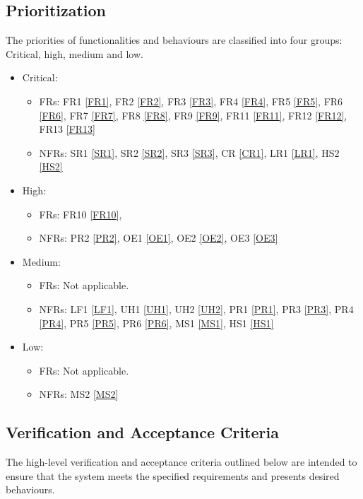 \documentclass[12pt]{article}
\begin{document}
\subsection{Prioritization}
The priorities of functionalities and behaviours are classified into four groups: Critical, high, medium and low. 
\begin{itemize}
    \item Critical:
    \begin{itemize}
        \item[] FRs: FR1 \ref{FR1}, FR2 \ref{FR2}, FR3 \ref{FR3}, FR4 \ref{FR4}, FR5 \ref{FR5}, FR6 \ref{FR6}, FR7 \ref{FR7}, FR8 \ref{FR8}, FR9 \ref{FR9}, FR11 \ref{FR11}, FR12 \ref{FR12}, FR13 \ref{FR13}
        \item[] NFRs: SR1 \ref{SR1}, SR2 \ref{SR2}, SR3 \ref{SR3}, CR \ref{CR1}, LR1 \ref{LR1}, HS2 \ref{HS2}
    \end{itemize}
    \item High:
    \begin{itemize}
        \item[] FRs: FR10 \ref{FR10}, 
        \item[] NFRs: PR2 \ref{PR2}, OE1 \ref{OE1}, OE2 \ref{OE2}, OE3 \ref{OE3}
    \end{itemize}
    \item Medium:
    \begin{itemize}
        \item[] FRs: Not applicable.
        \item[] NFRs: LF1 \ref{LF1}, UH1 \ref{UH1}, UH2 \ref{UH2}, PR1 \ref{PR1}, PR3 \ref{PR3}, PR4 \ref{PR4}, PR5 \ref{PR5}, PR6 \ref{PR6}, MS1 \ref{MS1}, HS1 \ref{HS1}
    \end{itemize}
    \item Low:
    \begin{itemize}
        \item[] FRs: Not applicable.
        \item[] NFRs: MS2 \ref{MS2}
    \end{itemize}
\end{itemize}
\subsection{Verification and Acceptance Criteria}
The high-level verification and acceptance criteria outlined below are intended to ensure that the system meets the specified requirements and presents desired behaviours.
\end{document}
